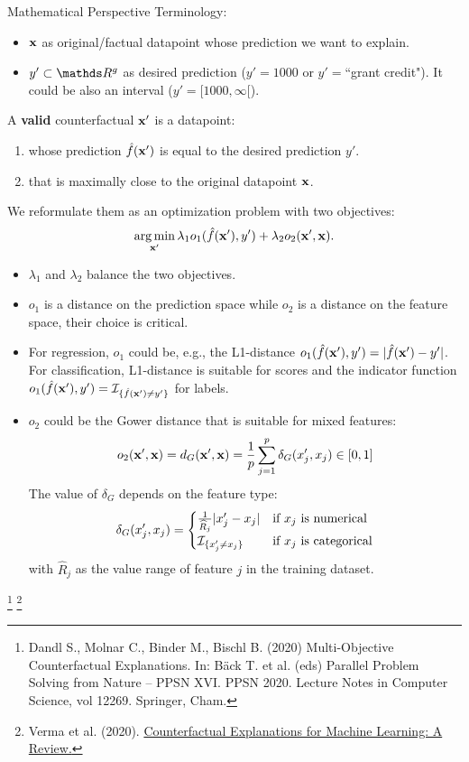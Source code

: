 \documentclass[11pt,compress,t,notes=noshow, aspectratio=169, xcolor=table]{beamer}
\begin{document}
\begin{vbframe}[allowframebreaks]{Mathematical Perspective}
	Terminology: 
	\begin{itemize}
		\item $\mathbf{x}$ as original/factual datapoint whose prediction we want to explain.
		\item $y' \subset \R^g$ as desired prediction ($y' = 1000$ or $y' = $``grant credit"). It could be also an interval ($y' = [1000, \infty[$).
	\end{itemize}
	\vspace{0.3cm}
	A \textbf{valid} counterfactual $\mathbf{x}'$ is a datapoint: 
	\begin{enumerate}
		\item whose prediction $\hat{f}(\mathbf{x}')$ is equal to the desired prediction $y'$. 
		\item that is maximally close to the original datapoint $\mathbf{x}$.
	\end{enumerate}
	We reformulate them as an optimization problem with two objectives: 
	\begin{equation}
		\mathop{\mathrm{arg\,min}}_{\mathbf{x}'} \lambda_1 o_1(\hat{f}(\mathbf{x}'), y') + \lambda_2 o_2(\mathbf{x}', \mathbf{x}).
		\label{eq:optim}
	\end{equation}
	\begin{itemize}
		\item $\lambda_1$ and $\lambda_2$ balance the two objectives.
		\item $o_1$ is a distance on the prediction space while $o_2$ is a distance on the feature space, their choice is critical.
		
		\framebreak
		
		\item For regression, $o_1$ could be, e.g., the L1-distance $o_1(\hat{f}(\mathbf{x}'), y') = |\hat{f}(\mathbf{x}')-y'|$. \\For classification, L1-distance is suitable for scores and the indicator function $o_1(\hat{f}(\mathbf{x}'), y') = \mathcal{I}_{\{ \hat{f}(\mathbf{x}') \neq y' \}}$ for labels. 
		\item $o_2$ could be the Gower distance that is suitable for mixed features: 
		$$o_2(\mathbf{x}', \mathbf{x}) = d_G(\mathbf{x}', \mathbf{x}) = \frac{1}{p}\sum_{j = 1}^{p} \delta_G(x'_j, x_j)	\in [0, 1]$$
		The value of $\delta_G$ depends on the feature type:
		\begin{equation*}
		\delta_G(x'_j, x_j) = 
		\begin{cases}
		\frac{1}{\widehat{R}_j}|x_j'- x_j| & \text{if $x_j$ is numerical} \\
		\mathcal{I}_{\{ x_j' \neq x_j \}} & \text{if $x_j$ is categorical}
		\end{cases}
		\end{equation*}
		with $\widehat{R}_j$ as the value range of feature $j$ in the training dataset. 
	\end{itemize}
\footnote[frame]{Dandl S., Molnar C., Binder M., Bischl B. (2020) Multi-Objective Counterfactual Explanations. In: Bäck T. et al. (eds) Parallel Problem Solving from Nature – PPSN XVI. PPSN 2020. Lecture Notes in Computer Science, vol 12269. Springer, Cham.}
\footnote[frame]{Verma et al. (2020). \href{https://arxiv.org/pdf/2010.10596.pdf}{Counterfactual Explanations for Machine Learning: A Review.}}
\end{vbframe}
\end{document}
